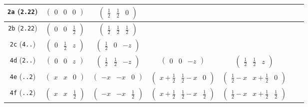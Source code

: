 \documentclass[fleqn,9pt,landscape]{jsarticle}
\begin{document}
\begin{center}
\begin{longtable}{ccccccc}
{\tt 2a} ({\tt 2.22}) & $ \begin{pmatrix} 0 & 0 & 0 \end{pmatrix} $ & $ \begin{pmatrix} \frac{1}{2} & \frac{1}{2} & 0 \end{pmatrix} $ & $  $ & $  $ & $  $ & $  $ \\ \hline
{\tt 2b} ({\tt 2.22}) & $ \begin{pmatrix} 0 & 0 & \frac{1}{2} \end{pmatrix} $ & $ \begin{pmatrix} \frac{1}{2} & \frac{1}{2} & \frac{1}{2} \end{pmatrix} $ & $  $ & $  $ & $  $ & $  $ \\ \hline
{\tt 2c} ({\tt 4..}) & $ \begin{pmatrix} 0 & \frac{1}{2} & z \end{pmatrix} $ & $ \begin{pmatrix} \frac{1}{2} & 0 & - z \end{pmatrix} $ & $  $ & $  $ & $  $ & $  $ \\ \hline
{\tt 4d} ({\tt 2..}) & $ \begin{pmatrix} 0 & 0 & z \end{pmatrix} $ & $ \begin{pmatrix} \frac{1}{2} & \frac{1}{2} & - z \end{pmatrix} $ & $ \begin{pmatrix} 0 & 0 & - z \end{pmatrix} $ & $ \begin{pmatrix} \frac{1}{2} & \frac{1}{2} & z \end{pmatrix} $ & $  $ & $  $ \\ \hline
{\tt 4e} ({\tt ..2}) & $ \begin{pmatrix} x & x & 0 \end{pmatrix} $ & $ \begin{pmatrix} - x & - x & 0 \end{pmatrix} $ & $ \begin{pmatrix} x + \frac{1}{2} & \frac{1}{2} - x & 0 \end{pmatrix} $ & $ \begin{pmatrix} \frac{1}{2} - x & x + \frac{1}{2} & 0 \end{pmatrix} $ & $  $ & $  $ \\ \hline
{\tt 4f} ({\tt ..2}) & $ \begin{pmatrix} x & x & \frac{1}{2} \end{pmatrix} $ & $ \begin{pmatrix} - x & - x & \frac{1}{2} \end{pmatrix} $ & $ \begin{pmatrix} x + \frac{1}{2} & \frac{1}{2} - x & \frac{1}{2} \end{pmatrix} $ & $ \begin{pmatrix} \frac{1}{2} - x & x + \frac{1}{2} & \frac{1}{2} \end{pmatrix} $ & $  $ & $  $ \\ \hline

\end{longtable}
\end{center}
\end{document}
